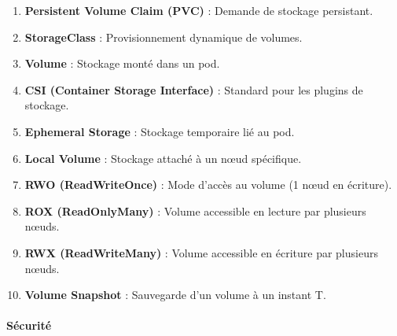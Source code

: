 \documentclass[
  letterpaper,
  DIV=11,
  numbers=noendperiod]{scrartcl}
\makeatletter
\let\oldparagraph\paragraph
\renewcommand{\paragraph}{
    \@ifstar
      \xxxParagraphStar
      \xxxParagraphNoStar
  }
\newcommand{\xxxParagraphStar}[1]{\oldparagraph*{#1}\mbox{}}
\newcommand{\xxxParagraphNoStar}[1]{\oldparagraph{#1}\mbox{}}
\providecommand{\tightlist}{%
  \setlength{\itemsep}{0pt}\setlength{\parskip}{0pt}}\usepackage{longtable,booktabs,array}
\makeatother
\begin{document}
\begin{enumerate}
\def\labelenumi{\arabic{enumi}.}
\setcounter{enumi}{40}
\tightlist
\item
  \textbf{Persistent Volume Claim (PVC)} : Demande de stockage
  persistant.\\
\item
  \textbf{StorageClass} : Provisionnement dynamique de volumes.\\
\item
  \textbf{Volume} : Stockage monté dans un pod.\\
\item
  \textbf{CSI (Container Storage Interface)} : Standard pour les plugins
  de stockage.\\
\item
  \textbf{Ephemeral Storage} : Stockage temporaire lié au pod.\\
\item
  \textbf{Local Volume} : Stockage attaché à un nœud spécifique.\\
\item
  \textbf{RWO (ReadWriteOnce)} : Mode d'accès au volume (1 nœud en
  écriture).\\
\item
  \textbf{ROX (ReadOnlyMany)} : Volume accessible en lecture par
  plusieurs nœuds.\\
\item
  \textbf{RWX (ReadWriteMany)} : Volume accessible en écriture par
  plusieurs nœuds.\\
\item
  \textbf{Volume Snapshot} : Sauvegarde d'un volume à un instant T.
\end{enumerate}

\paragraph{\texorpdfstring{\textbf{Sécurité}}{Sécurité}}\label{suxe9curituxe9}
\end{document}

